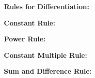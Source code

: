 \documentclass[addpoints, 12pt]{exam}
\begin{document}
\noindent\textbf{Rules for Differentiation:}
\begin{questions}
    \question \textbf{Constant Rule:}
    
    \question \textbf{Power Rule:}
    
    \question \textbf{Constant Multiple Rule:}
    
    \question \textbf{Sum and Difference Rule:}
    \begin{parts}

\end{parts}
\end{questions}
\end{document}
